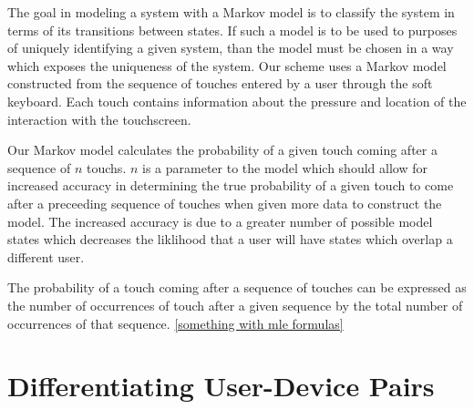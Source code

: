 \documentclass{acm_proc_article-sp}
\begin{document}
The goal in modeling a system with a Markov model is to classify the system in terms of its transitions between states. If such a model is to be used to purposes of uniquely identifying a given system, than the model must be chosen in a way which exposes the uniqueness of the system. Our scheme uses a Markov model constructed from the sequence of touches entered by a user through the soft keyboard.
Each touch contains information about the pressure and location of the interaction with the touchscreen.

Our Markov model calculates the probability of a given touch coming after a sequence of $n$ touchs. $n$ is a parameter to the model which should allow for increased accuracy in determining the true probability of a given touch to come after a preceeding sequence of touches when given more data to construct the model. The increased accuracy is due to a greater number of possible model states which decreases the liklihood that a user will have states which overlap a different user.

The probability of a touch coming after a sequence of touches can be expressed as the number of occurrences of touch after a given sequence by the total number of occurrences of that sequence.
\ref{something with mle formulas}


\section{Differentiating User-Device Pairs}
\label{sec:differentiation}
\end{document}
